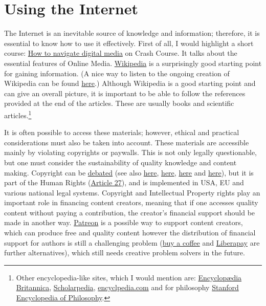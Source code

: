 \documentclass{article}
\begin{document}
\section{Using the Internet}

The Internet is an inevitable source of knowledge and information; therefore, it is essential to know how to use it effectively.
First of all, I would highlight a short course: \href{https://www.youtube.com/playlist?list=PL8dPuuaLjXtN07XYqqWSKpPrtNDiCHTzU}{How to navigate digital media} on Crash Course. It talks about the essential features of Online Media.
\href{https://www.wikipedia.org/}{Wikipedia} is a surprisingly good starting point for gaining information. (A nice way to listen to the ongoing creation of Wikipedia can be found \href{http://listen.hatnote.com/#nowelcomes,en}{here}.)
Although Wikipedia is a good starting point and can give an overall picture, it is important to be able to follow the references provided at the end of the articles.
These are usually books and scientific articles.\footnote{Other encyclopedia-like sites, which I would mention are: \href{https://www.britannica.com/}{Encyclopædia Britannica}, \href{http://www.scholarpedia.org/article/Main_Page}{Scholarpedia}, \href{https://www.encyclopedia.com/}{encyclpedia.com} and for philosophy \href{https://plato.stanford.edu/index.html}{Stanford Encyclopedia of Philosophy}.}

It is often possible to access these materials; however, ethical and practical considerations must also be taken into account.
These materials are accessible mainly by violating copyrights or paywalls. This is not only legally questionable, but one must consider the sustainability of quality knowledge and content making. Copyright can be \href{https://link.springer.com/chapter/10.1007/978-981-10-3984-3_7}{debated} (see also \href{https://www.youtube.com/watch?v=rFMl0stqai0}{here}, \href{https://en.wikipedia.org/wiki/Criticism_of_copyright}{here}, \href{https://en.wikipedia.org/wiki/Right_to_science_and_culture}{here} and \href{https://www.ted.com/talks/lawrence_lessig_laws_that_choke_creativity}{here}), but it is part of the Human Rights (\href{https://www.humanrights.com/what-are-human-rights/videos/copyright.html}{Article 27}), and is implemented in USA, EU and various national legal systems. Copyright and Intellectual Property rights play an important role in financing content creators, meaning that if one accesses quality content without paying a contribution, the creator's financial support should be made in another way.
\href{https://www.patreon.com/}{Patreon} is a possible way to support content creators, which can produce free and quality content however the distribution of financial support for authors is still a challenging problem (\href{https://ko-fi.com/}{buy a coffee} and \href{https://liberapay.com/}{Liberapay} are further alternatives), which still needs creative problem solvers in the future.
\end{document}
